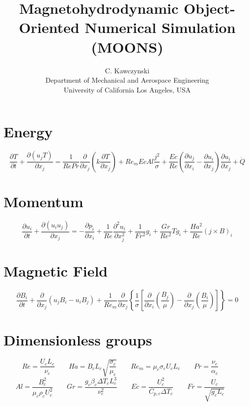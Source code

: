 \documentclass[11pt]{article}
\begin{document}
\doublespacing
\title{Magnetohydrodynamic Object-Oriented Numerical Simulation (MOONS)}
\author{C. Kawczynski \\
Department of Mechanical and Aerospace Engineering \\
University of California Los Angeles, USA\\}
\section{Energy}
\Large
\begin{equation}
	\frac{\partial T}{\partial t} +
	\frac{\partial (u_j T)}{\partial x_j}
	= 
	\frac{1}{Re Pr}
	\frac{\partial}{\partial x_j}
	\left( 
	k \frac{\partial T}{\partial x_j}
	\right) + 
	Re_m Ec Al
	\frac{{j}^2}{\sigma} +
	\frac{Ec}{Re}
	\left(
	\frac{\partial u_j}{\partial x_i}
	-
	\frac{\partial u_i}{\partial x_j}
	\right)
	\frac{\partial u_i}{\partial x_j} +
	\dot{Q}
\end{equation}
\section{Momentum}
\begin{equation}
	\frac{\partial u_i}{\partial t} + 
	\frac{\partial (u_i u_j)}{\partial x_j}
	= 
	- \frac{\partial p_i}{\partial x_i}
	+ \frac{1}{Re}
	\frac{\partial^2 u_i}{\partial x_j^2}
	+ \frac{1}{Fr^2}
	g_i
	+ \frac{Gr}{Re^2}
	T g_i
	+ \frac{Ha^2}{Re}
	(j \times B)_i
\end{equation}
\section{Magnetic Field}
\begin{equation}
	\frac{\partial B_i}{\partial t} 
	+ \frac{\partial}{\partial x_j} (u_j B_i - u_i B_j) 
	+ \frac{1}{Re_m}
	\frac{\partial}{\partial x_j} 
	\left\{ \frac{1}{\sigma} 
	\left[ 
	\frac{\partial}{\partial x_i} 
	\left( \frac{B_j}{\mu} \right) - 
	\frac{\partial}{\partial x_j} 
	\left( \frac{B_i}{\mu} \right)
	\right]
	\right\} = 0
\end{equation}

\section{Dimensionless groups}
\begin{equation}
	Re = \frac{U_c L_c}{\nu_c} \qquad
	Ha = B_c L_c \sqrt{\frac{\sigma_c}{\mu_c}} \qquad
	Re_m = \mu_c \sigma_c U_c L_c \qquad
	Pr = \frac{\nu_c}{\alpha_c} \qquad
\end{equation}
\begin{equation}
	Al = \frac{B_c^2}{\mu_c \rho_c U_c^2} \qquad
	Gr = \frac{g_c \beta_c \Delta T_c L_c^3}{\nu_c^2} \qquad
	Ec = \frac{U_c^2}{C_{p,c} \Delta T_c} \qquad
	Fr = \frac{U_c}{\sqrt{g_c L_c}} \qquad
\end{equation}
\end{document}
